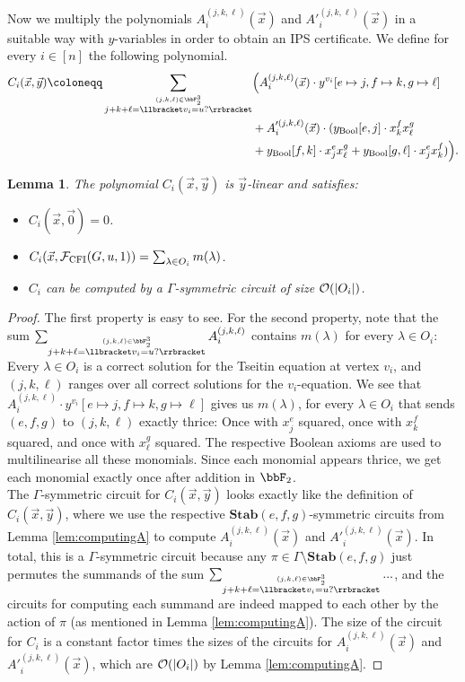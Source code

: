 \documentclass[10pt,a4paper]{article}
\newtheorem{lemma}[theorem]{Lemma}
\newcommand{\Ff}{{\cal F}}
\newcommand{\Oo}{{\cal O}}
\newcommand{\Stab}{\mathbf{Stab}}
\newcommand{\CFI}{\Ff_{\mathrm{CFI}}}
\begin{document}
Now we multiply the polynomials $A^{(j,k,\ell)}_i(\vec x)$ and $A'^{(j,k,\ell)}_i(\vec x)$ in a suitable way with $y$-variables in order to obtain an IPS certificate. We define for every $i \in [n]$ the following polynomial.
\begin{align*}
	C_i(\vec x, \vec y) \coloneqq \sum_{\stackrel{(j,k,\ell) \in \bbF_2^3}{j+k+\ell = \llbracket v_i = u? \rrbracket}} &\Big(A^{(j,k,\ell)}_i(\vec x) \cdot y^{v_i}[e \mapsto j, f \mapsto k, g \mapsto \ell]\\
	&+ A'^{(j,k,\ell)}_i(\vec x) \cdot (y_{\text{Bool}}[e,j] \cdot x^f_kx^g_\ell \\
	&+ y_{\text{Bool}}[f,k]\cdot x^e_jx^g_\ell+ y_{\text{Bool}}[g,\ell]\cdot x^e_jx^f_k ) \Big).
\end{align*}
\begin{lemma}
	\label{lem:Ccomputable}
	The polynomial $C_i(\vec x, \vec y)$ is $\vec y$-linear and satisfies:
	\begin{itemize}
		\item $C_i(\vec x, \vec 0) = 0$.
		\item $C_i(\vec x, \CFI(G,u,1)) = \sum_{\lambda \in O_i} m(\lambda)$. 
		\item $C_i$ can be computed by a $\Gamma$-symmetric circuit of size $\Oo(|O_i|)$.
	\end{itemize}
\end{lemma}	
\begin{proof}
	The first property is easy to see. For the second property, note that the sum $\sum_{\stackrel{(j,k,\ell) \in \bbF_2^3}{j+k+\ell = \llbracket v_i = u? \rrbracket}} A^{(j,k,\ell)}_i$ contains $m(\lambda)$ for every $\lambda \in O_i$: Every $\lambda \in O_i$ is a correct solution for the Tseitin equation at vertex $v_i$, and $(j,k,\ell)$ ranges over all correct solutions for the $v_i$-equation.
	We see that $A^{(j,k,\ell)}_i \cdot y^{v_i}[e \mapsto j, f \mapsto k, g \mapsto \ell]$ gives us $m(\lambda)$, for every $\lambda \in O_i$ that sends $(e,f,g)$ to $(j,k,\ell)$ exactly thrice: Once with $x^e_j$ squared, once with $x^f_k$ squared, and once with $x^g_\ell$ squared. The respective Boolean axioms are used to multilinearise all these monomials. Since each monomial appears thrice, we get each monomial exactly once after addition in $\bbF_2$.\\
	The $\Gamma$-symmetric circuit for $C_i(\vec x, \vec y)$ looks exactly like the definition of $C_i(\vec x, \vec y)$, where we use the respective $\Stab(e,f,g)$-symmetric circuits from Lemma \ref{lem:computingA} to compute $A^{(j,k,\ell)}_i(\vec x)$ and $A'^{(j,k,\ell)}_i(\vec x)$. In total, this is a $\Gamma$-symmetric circuit because any $\pi \in \Gamma \setminus \Stab(e,f,g)$ just permutes the summands of the sum $\sum_{\stackrel{(j,k,\ell) \in \bbF_2^3}{j+k+\ell = \llbracket v_i = u? \rrbracket}} ...$, and the circuits for computing each summand are indeed mapped to each other by the action of $\pi$ (as mentioned in Lemma \ref{lem:computingA}). The size of the circuit for $C_i$ is a constant factor times the sizes of the circuits for $A^{(j,k,\ell)}_i(\vec x)$ and $A'^{(j,k,\ell)}_i(\vec x)$, which are $\Oo(|O_i|)$ by Lemma \ref{lem:computingA}. 
\end{proof}	
\end{document}
